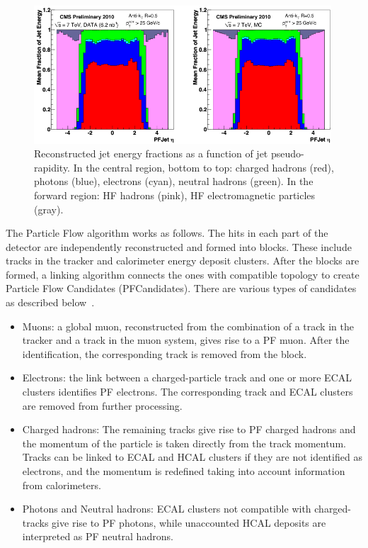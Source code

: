 \begin{figure}
\begin{center}
\includegraphics[width=0.99\textwidth]{Reconstruction/Pandolfi_jetenergy.pdf}
\caption{Reconstructed jet energy fractions as a function of jet pseudo-rapidity. In the central region, bottom to top: charged hadrons (red), photons (blue), electrons (cyan), neutral hadrons (green). In the forward region: HF hadrons (pink), HF electromagnetic particles (gray).~\cite{Pandolfi_thesis}}
\label{fig:jet_energy_components}
\end{center}
\end{figure}

The Particle Flow algorithm works as follows. The hits in each part of the detector are independently reconstructed and formed into blocks.  These include tracks in the tracker and calorimeter energy deposit clusters. After the blocks are formed, a linking algorithm connects the ones with compatible topology to create Particle Flow Candidates (PFCandidates).  There are various types of candidates as described below~\cite{Cosa_thesis}.

\begin{itemize}
\item
Muons: a global muon, reconstructed from the combination of a track in the tracker and a track in the muon system, gives rise to a PF muon. After the identification, the corresponding track is removed from the block.
\item
 Electrons: the link between a charged-particle track and one or more ECAL clusters identifies PF electrons. The corresponding track and ECAL clusters are removed from further processing.
\item
 Charged hadrons: The remaining tracks give rise to PF charged hadrons and the momentum of the particle is taken directly from the track momentum. Tracks can be linked to ECAL and HCAL clusters if they are not identified as electrons, and the momentum is redefined taking into account information from calorimeters.
\item
Photons and Neutral hadrons: ECAL clusters not compatible with charged-tracks give rise to PF photons, while unaccounted HCAL deposits are interpreted as PF neutral hadrons.
\end{itemize}

